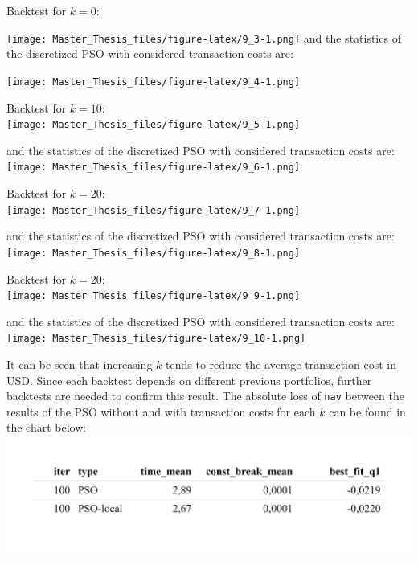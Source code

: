 \documentclass[
  oneside]{book}
\begin{document}
Backtest for \(k=0\):

\texttt{[image: Master\_Thesis\_files/figure-latex/9\_3-1.png]}
and the statistics of the discretized PSO with considered transaction costs are:

\texttt{[image: Master\_Thesis\_files/figure-latex/9\_4-1.png]}

Backtest for \(k=10\):\\
\texttt{[image: Master\_Thesis\_files/figure-latex/9\_5-1.png]}

and the statistics of the discretized PSO with considered transaction costs are:\\
\texttt{[image: Master\_Thesis\_files/figure-latex/9\_6-1.png]}

Backtest for \(k=20\):\\
\texttt{[image: Master\_Thesis\_files/figure-latex/9\_7-1.png]}

and the statistics of the discretized PSO with considered transaction costs are:\\
\texttt{[image: Master\_Thesis\_files/figure-latex/9\_8-1.png]}

Backtest for \(k=20\):\\
\texttt{[image: Master\_Thesis\_files/figure-latex/9\_9-1.png]}

and the statistics of the discretized PSO with considered transaction costs are:\\
\texttt{[image: Master\_Thesis\_files/figure-latex/9\_10-1.png]}

It can be seen that increasing \(k\) tends to reduce the average transaction cost in USD. Since each backtest depends on different previous portfolios, further backtests are needed to confirm this result. The absolute loss of \texttt{nav} between the results of the PSO without and with transaction costs for each \(k\) can be found in the chart below:\\
\includegraphics{Master_Thesis_files/figure-latex/unnamed-chunk-13-1.png}
\end{document}
